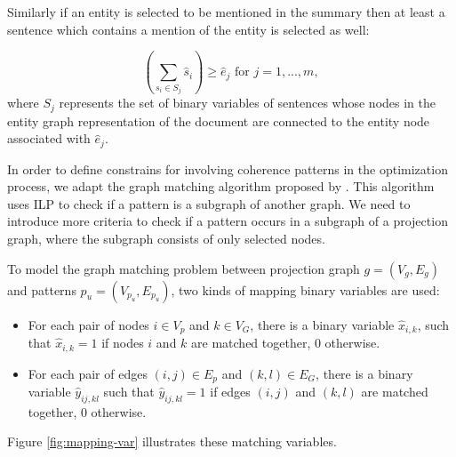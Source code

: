 Similarly if an entity is selected to be mentioned in the summary then at least a sentence which contains a mention of the entity is selected as well:   

\begin{equation}
(\sum_{s_i \in S_j}{\hat{s}_i}) \ge \hat{e}_j\text{ for }j = 1,...,m,
\end{equation}
where $S_j$ represents the set of binary variables of sentences whose nodes in the entity graph representation of the document are connected to the entity node associated with $\hat{e}_j$.  

In order to define constrains for involving coherence patterns in the optimization process, we adapt the graph matching algorithm proposed by .
This algorithm uses ILP to check if a pattern is a subgraph of another graph. 
We need to introduce more criteria to check if a pattern occurs in a subgraph of a projection graph,  where the subgraph consists of only selected nodes. 

To model the graph matching problem between projection graph $g=(V_{g},E_{g})$ and patterns $p_{u}=(V_{p_{u}},E_{p_{u}})$, two kinds of mapping binary variables are used: 

\begin{itemize}

	\item 
	For each pair of nodes $i \in V_{p}$ and $k \in V_G$, there is a binary variable $\hat{x}_{i,k}$, such that $\hat{x}_{i,k} = 1$ if nodes $i$ and $k$ are matched together, $0$ otherwise. 

	\item For each pair of edges $(i,j) \in E_{p}$ and $(k,l) \in E_G$, there is a binary variable $\hat{y}_{ij,kl}$ such that $\hat{y}_{ij,kl} = 1$ if edges $(i,j)$ and $(k,l)$ are matched together, $0$ otherwise.

\end{itemize}

Figure \ref{fig:mapping-var} illustrates these matching variables. 

